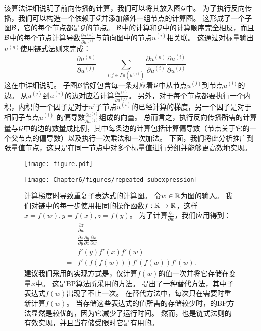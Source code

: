 该算法详细说明了前向传播的计算，我们可以将其放入图$\mathcal{G}$中。
为了执行反向传播，我们可以构造一个依赖于$\mathcal{G}$并添加额外一组节点的计算图。
这形成了一个子图$\mathcal{B}$，它的每个节点都是$\mathcal{G}$的节点。
$\mathcal{B}$中的计算和$\mathcal{G}$中的计算顺序完全相反，而且$\mathcal{B}$中的每个节点计算导数$\frac{\partial u^{(n)}}{\partial u^{(i)}}$与前向图中的节点$u^{(i)}$相关联。
这通过对标量输出$u^{(n)}$使用链式法则来完成：
\begin{equation}
  \frac{\partial u^{(n)}}{\partial u^{(j)}} = \sum_{i:j \in Pa(u^{(i)})} \frac{\partial u^{(n)} }{ \partial u^{(i)} } \frac{ \partial u^{(i)} }{ \partial u^{(j)} }
  \label{eq:6.49}
\end{equation}
这在中详细说明。
子图$\mathcal{B}$恰好包含每一条对应着$\mathcal{G}$中从节点$u^{(j)}$到节点$u^{(i)}$的边。
从$u^{(j)}$到$u^{(i)}$的边对应着计算$\frac{\partial u^{(i)}}{\partial u^{(j)}}$。
另外，对于每个节点都要执行一个内积，内积的一个因子是对于$u^{j}$子节点$u^{(i)}$的已经计算的梯度，另一个因子是对于相同子节点$u^{(i)}$ 的偏导数$\frac{\partial u^{(i)}}{\partial u^{(j)}}$组成的向量。
总而言之，执行反向传播所需的计算量与$\mathcal{G}$中的边的数量成比例，其中每条边的计算包括计算偏导数（节点关于它的一个父节点的偏导数）以及执行一次乘法和一次加法。
下面，我们将此分析推广到张量值节点，这只是在同一节点中对多个标量值进行分组并能够更高效地实现。
\begin{figure}[!htb]
\ifOpenSource
\centerline{\texttt{[image: figure.pdf]}}
\else
\centerline{\texttt{[image: Chapter6/figures/repeated\_subexpression]}}
\fi
\captionsetup{singlelinecheck=off}
\caption[.]{
计算梯度时导致重复子表达式的计算图。
令$w \in \mathbb{R}$为图的输入。
我们对链中的每一步使用相同的操作函数$f: \mathbb{R} \to \mathbb{R}$，这样$x=f(w), y=f(x), z=f(y)$。
为了计算$\frac{\partial z}{\partial w}$，我们应用得到：
\begin{align}
& \frac{\partial z}{\partial w}\\
=& \frac{\partial z}{\partial y} \frac{\partial y}{\partial x} \frac{\partial x}{\partial w}\\
\label{eq:6.52}
=& f'(y)f'(x)f'(w)\\ 
\label{eq:6.53}
=& f'(f(f(w))) f'(f(w)) f'(w). 
\end{align}
建议我们采用的实现方式是，仅计算$f(w)$的值一次并将它存储在变量$x$中。
这是\gls{BP}算法所采用的方法。
提出了一种替代方法，其中子表达式$f(w)$出现了不止一次。
在替代方法中，每次只在需要时重新计算$f(w)$。
当存储这些表达式的值所需的存储较少时，的\gls{BP}方法显然是较优的，因为它减少了运行时间。
然而，也是链式法则的有效实现，并且当存储受限时它是有用的。}
\label{fig:chap6_repeated_subexpression}
\end{figure}

